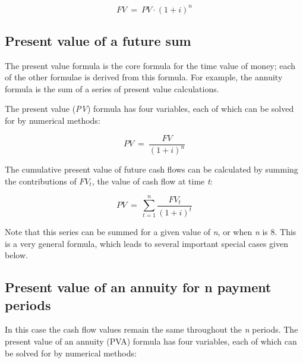 $$FV   \ = \  PV \cdot (1+i)^n$$




\subsection{Present value of a future sum}
\label{sss:pres-3bc0}




The present value formula is the core formula for the time value of money; each of the
other formulae is derived from this formula. For example, the annuity formula is the sum
of a series of present value calculations.



The present value (\textit{PV}) formula has four variables, each of which can be solved
for by numerical methods:



$$PV \ = \ \frac{FV}{(1+i)^n}$$



The cumulative present value of future cash flows can be calculated by summing the
contributions of $FV _t$, the value of cash flow at time \textit{t}:



$$PV \ = \ \sum _{t=1}^{n} \frac{FV _{t}}{(1+i)^t}$$



Note that this series can be summed for a given value of \textit{n}, or when \textit{n} is
8. This is a very general formula, which leads to several important special cases given
below.




\subsection{Present value of an annuity for n payment periods}
\label{sss:pres-bbc0}




In this case the cash flow values remain the same throughout the \textit{n} periods. The
present value of an annuity (PVA) formula has four variables, each of which can be solved
for by numerical methods:



